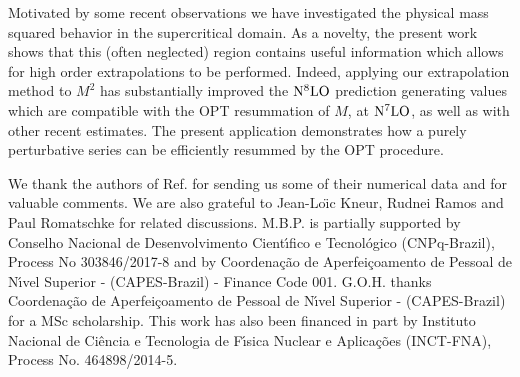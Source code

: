 \documentclass[a4paper,11pt]{article}
\begin{document}
Motivated by some recent observations \cite {serone4} we have investigated  the physical mass squared  behavior in the supercritical domain.  As a novelty, the present work  shows that this (often neglected)   region contains useful information which allows for high order extrapolations  to be performed.  Indeed, applying our extrapolation method to $M^2$ has substantially improved the  ${\rm N}^8{\rm LO}$ prediction generating values which are compatible with the OPT resummation of $M$, at ${\rm N}^7{\rm LO}$, as well as with other recent estimates. The present application demonstrates how a purely perturbative series can be efficiently resummed by the OPT procedure. 





 
 

\acknowledgments
We thank the authors of Ref. \cite{serone1} for sending us some of their numerical data and for valuable comments. We are also grateful to  Jean-Lo\"{\i}c Kneur, Rudnei Ramos and Paul Romatschke   for related discussions. M.B.P. is  partially supported by Conselho Nacional de Desenvolvimento Cient\'{\i}fico e Tecnol\'{o}gico (CNPq-Brazil), Process No 303846/2017-8 and by Coordena\c c\~{a}o  de Aperfei\c coamento de Pessoal de  N\'{\i}vel Superior - (CAPES-Brazil)  -
Finance  Code  001. G.O.H. thanks Coordena\c c\~{a}o  de Aperfei\c coamento de Pessoal de  N\'{\i}vel Superior - (CAPES-Brazil) for a MSc scholarship.
This work has also been financed  in  part  by  Instituto  Nacional  de  Ci\^encia  e Tecnologia de F\'{\i}sica Nuclear e Aplica\c c\~{o}es  (INCT-FNA), Process No.  464898/2014-5.
 
\end{document}
